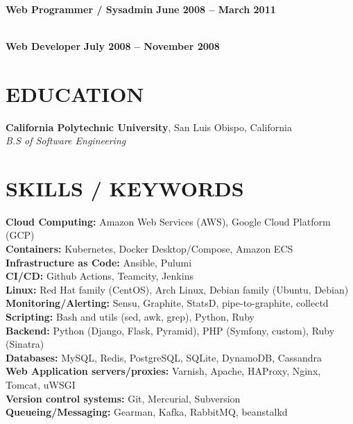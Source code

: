 \documentclass[margin,line]{resume}
\begin{document}
\begin{resume}
     \vspace{1mm}\\%
    \textbf{Web Programmer / Sysadmin} \hfill \textbf{June 2008 -- March 2011}

     \vspace{1mm}\\%
    \textbf{Web Developer} \hfill \textbf{July 2008 -- November 2008}

\sectionline
    \section{\mysidestyle \textbf{\large{E}\small{DUCATION}}}

    \textbf{\listing California Polytechnic University}, San Luis Obispo, California \vspace{1mm}\\
    \textsl{B.S of Software Engineering} \vspace{-3mm}\\\vspace{-1mm}%

\sectionline
    \section{\mysidestyle \textbf{\large{S}\small{KILLS} / \large{K}\small{EYWORDS}}}

    \textbf{Cloud Computing:} Amazon Web Services (AWS), Google Cloud Platform (GCP)\\
    \textbf{Containers:} Kubernetes, Docker Desktop/Compose, Amazon ECS\\
    \textbf{Infrastructure as Code:} Ansible, Pulumi\\
    \textbf{CI/CD:} Github Actions, Teamcity, Jenkins\\
    \textbf{Linux:} Red Hat family (CentOS), Arch Linux, Debian family (Ubuntu, Debian)\\
    \textbf{Monitoring/Alerting:} Sensu, Graphite, StatsD, pipe-to-graphite, collectd\\
    \textbf{Scripting:} Bash and utils (sed, awk, grep), Python, Ruby\\
    \textbf{Backend:} Python (Django, Flask, Pyramid), PHP (Symfony, custom), Ruby (Sinatra)\\
    \textbf{Databases:} MySQL, Redis, PostgreSQL, SQLite, DynamoDB, Cassandra\\
    \textbf{Web Application servers/proxies:} Varnish, Apache, HAProxy, Nginx, Tomcat, uWSGI\\
    \textbf{Version control systems:} Git, Mercurial, Subversion\\
    \textbf{Queueing/Messaging:} Gearman, Kafka, RabbitMQ, beanstalkd

\end{resume}
\end{document}

